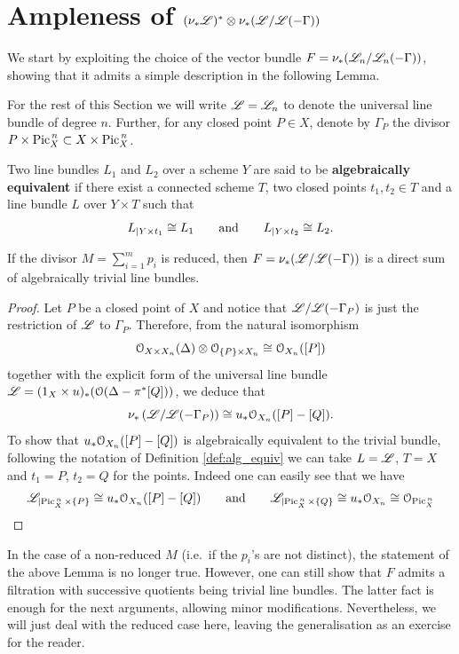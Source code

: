 \section{Ampleness of $(\nu_{*} \mathscr{L})^* \otimes \nu_{*} (\mathscr{L}/\mathscr{L}(-\Gamma))$}\label{sec:ampleness}

	We start by exploiting the choice of the vector bundle $F = \nu_{*} (\mathscr{L}_n / \mathscr{L}_n(-\Gamma))$, showing that it admits a simple description in the following Lemma. 

	\begin{notation}
		For the rest of this Section we will write $\mathscr{L}=\mathscr{L}_n$ to denote the universal line bundle of degree $n$. Further, for any closed point $P\in X$, denote by $\Gamma_P $ the divisor $P \times \operatorname{Pic}^{\,n}_X \subset X\times \operatorname{Pic}^{\,n}_X$.
	\end{notation}
	\begin{defi}\label{def:alg_equiv}
		Two line bundles $L_1$ and $L_2$ over a scheme $Y$ are said to be \textbf{algebraically equivalent} if there exist a connected scheme $T$, two closed points $t_1,t_2\in T$ and a line bundle $L$ over $Y\times T$ such that
		$$ L_{\mid Y\times t_1} \cong L_1 \qquad \text{and} \qquad L_{\mid Y\times t_2} \cong L_2. $$
	\end{defi}

	\begin{lemm}\label{lemm:alg_trivial}
		If the divisor $M=\sum_{i=1}^m p_i$ is reduced, then $F=\nu_{*} (\mathscr{L} / \mathscr{L}(-\Gamma))$ is a direct sum of algebraically trivial line bundles.
	\end{lemm}
	\begin{proof}
		Let $P$ be a closed point of $X$ and notice that $\mathscr{L}/\mathscr{L}(-\Gamma_P)$ is just the restriction of $\mathscr{L}$ to $\Gamma_P$. Therefore, from the natural isomorphism
		$$ \mathcal{O}_{X\times X_n}(\Delta)\otimes \mathcal{O}_{\{P\}\times X_n} \cong \mathcal{O}_{X_n}([P]) $$
		together with the explicit form of the universal line bundle $\mathscr{L} = (1_X\times u)_*(\mathcal{O}(\Delta - \pi^* [Q]))$, we deduce that 
		\begin{equation}\label{eq:description}
			\nu_{*} \left(\mathscr{L}/\mathscr{L}(-\Gamma_P)\right) \cong u_* \mathcal{O}_{X_n}([P]-[Q]).
		\end{equation}
		To show that $\nobreak{u_* \mathcal{O}_{X_n}([P]-[Q])}$ is algebraically equivalent to the trivial bundle, following the notation of Definition \ref{def:alg_equiv} we can take $L=\mathscr{L}$, $T=X$ and $t_1=P$, $t_2=Q$ for the points. Indeed one can easily see that we have
		$$ \mathscr{L}_{\mid \operatorname{Pic}^{\,n}_X\times \{P\}} \cong u_* \mathcal{O}_{X_n}([P]-[Q]) \qquad \text{and} \qquad \mathscr{L}_{\mid \operatorname{Pic}^{\,n}_X\times \{Q\}} \cong u_*\mathcal{O}_{X_n} \cong \mathcal{O}_{\operatorname{Pic}^{\,n}_X} $$
	\end{proof}
	\begin{rema}
		In the case of a non-reduced $M$ (i.e.\ if the $p_i$'s are not distinct), the statement of the above Lemma is no longer true. However, one can still show that $F$ admits a filtration with successive quotients being trivial line bundles. The latter fact is enough for the next arguments, allowing minor modifications. Nevertheless, we will just deal with the reduced case here, leaving the generalisation as an exercise for the reader.
	\end{rema}


